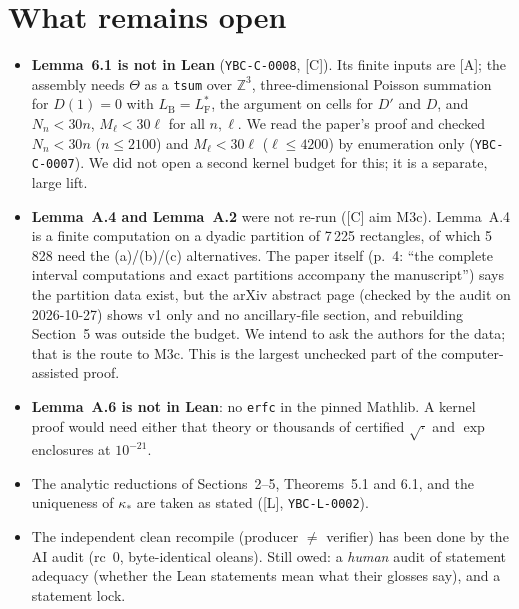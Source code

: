 \documentclass[11pt]{article}
\newcommand{\tier}[1]{\textsf{[#1]}}
\newcommand{\tA}{\tier{A}}
\newcommand{\tL}{\tier{L}}
\newcommand{\tC}{\tier{C}}
\newcommand{\lean}[1]{\texttt{#1}}
\newcommand{\LF}{L_{\mathrm F}}
\newcommand{\LB}{L_{\mathrm B}}
\newcommand{\ks}{\kappa_*}
\begin{document}
\section{What remains open}\label{sec:open}
\begin{itemize}\itemsep=1pt
\item \textbf{Lemma~6.1 is not in Lean} (\texttt{YBC-C-0008}, \tC). Its finite inputs are \tA; the assembly needs $\Theta$ as a \lean{tsum} over $\mathbb Z^3$, three-dimensional Poisson summation for $D(1)=0$ with $\LB=\LF^*$, the argument on cells for $D'$ and $D$, and $N_n<30n$, $M_\ell<30\ell$ for all $n,\ell$. We read the paper's proof and checked $N_n<30n$ ($n\le2100$) and $M_\ell<30\ell$ ($\ell\le4200$) by enumeration only (\texttt{YBC-C-0007}). We did not open a second kernel budget for this; it is a separate, large lift.
\item \textbf{Lemma~A.4 and Lemma~A.2} were not re-run (\tC{} aim M3c). Lemma~A.4 is a finite computation on a dyadic partition of 7\,225 rectangles, of which 5\,828 need the (a)/(b)/(c) alternatives. The paper itself (p.~4: ``the complete interval computations and exact partitions accompany the manuscript'') says the partition data exist, but the arXiv abstract page (checked by the audit on 2026-10-27) shows v1 only and no ancillary-file section, and rebuilding Section~5 was outside the budget. We intend to ask the authors for the data; that is the route to M3c. This is the largest unchecked part of the computer-assisted proof.
\item \textbf{Lemma~A.6 is not in Lean}: no \lean{erfc} in the pinned Mathlib. A kernel proof would need either that theory or thousands of certified $\sqrt{\cdot}$ and $\exp$ enclosures at $10^{-21}$.
\item The analytic reductions of Sections~2--5, Theorems~5.1 and 6.1, and the uniqueness of $\ks$ are taken as stated (\tL{}, \texttt{YBC-L-0002}).
\item The independent clean recompile (producer $\ne$ verifier) has been done by the AI audit (rc~0, byte-identical oleans). Still owed: a \emph{human} audit of statement adequacy (whether the Lean statements mean what their glosses say), and a statement lock.
\end{itemize}

\end{document}
